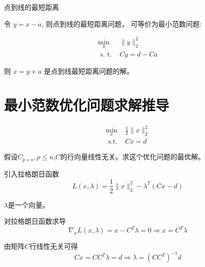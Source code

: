 \begin{FigureCenter}{点到线的最短距离}
    
\end{FigureCenter}


令 $ y=x-a $, 则点到线的最短距离问题， 可等价为最小范数问题:

\begin{problem}
    \begin{equation}
\begin{array}{ll}
\min _{y} & \|y\|_{2}^{2} \\
\text { s. t. } & C y=d-C a
\end{array}
\end{equation}
\end{problem}

则 $ x=y+a $ 是点到线最短距离问题的解。

\section{最小范数优化问题求解推导}

\begin{problem}
    \begin{equation}
\begin{array}{ll}
\min _{x}& \frac{1}{2}\|x\|_{2}^{2} \\
\text { s.t. }& C x=d
\end{array}
\end{equation}

假设$C_{p \times n}, p \le n$,$C$的行向量线性无关。求这个优化问题的最优解。
\end{problem}

引入拉格朗日函数
\begin{equation}
L(x, \lambda)=\frac{1}{2}\|x\|_{2}^{2}-\lambda^{T}(C x-d)
\end{equation}

\begin{remark}
    $\lambda$是一个向量。
\end{remark}

对拉格朗日函数求导
\begin{equation}
\nabla_{x} L(x, \lambda)=x-C^{T} \lambda=0 \Rightarrow x=C^{T} \lambda
\end{equation}

由矩阵$C$行线性无关可得
\begin{equation}
C x=C C^{T} \lambda=d \Rightarrow \lambda=\left(C C^{T}\right)^{-1} d
\end{equation}

